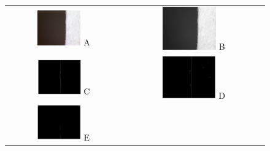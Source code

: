 \begin{figure}[H]
	\centering

	\begin{tabular}{cc}
		\includegraphics[width=0.4\textwidth]{figures/dilatometer_test.jpg} A &
		\includegraphics[width=0.4\textwidth]{figures/dilatometer_test2.jpg} B  \\
		\includegraphics[width=0.4\textwidth]{figures/dila_blur7thresh36.png} C &
		\includegraphics[width=0.4\textwidth]{figures/dila_blur5thresh30.png} D \\
		\includegraphics[width=0.4\textwidth]{figures/dila_blur9thresh35.png} E &

\end{tabular}
\end{figure}
